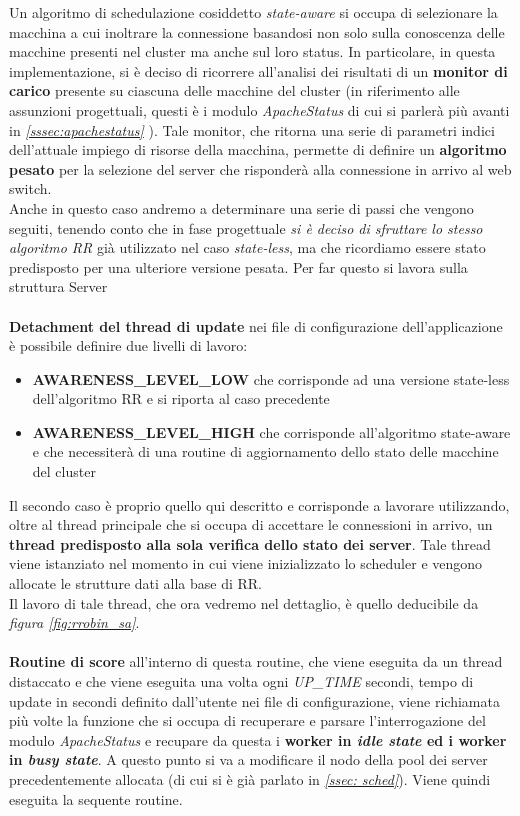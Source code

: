 \documentclass[italian]{tktltiki2}
\begin{document}
Un algoritmo di schedulazione cosiddetto \emph{state-aware} si occupa di selezionare la macchina a cui inoltrare la connessione basandosi non solo sulla conoscenza delle macchine presenti nel cluster ma anche sul loro status. In particolare, in questa implementazione, si è deciso di ricorrere all'analisi dei risultati di un \textbf{monitor di carico} presente su ciascuna delle macchine del cluster (in riferimento alle assunzioni progettuali, questi è i modulo \emph{ApacheStatus} di cui si parlerà più avanti in \emph{\ref{sssec:apachestatus}} ). Tale monitor, che ritorna una serie di parametri indici dell'attuale impiego di risorse della macchina, permette di definire un \textbf{algoritmo pesato} per la selezione del server che risponderà alla connessione in arrivo al web switch. \\
Anche in questo caso andremo a determinare una serie di passi che vengono seguiti, tenendo conto che in fase progettuale \emph{si è deciso di sfruttare lo stesso algoritmo RR} già utilizzato nel caso \emph{state-less}, ma che ricordiamo essere stato predisposto per una ulteriore versione pesata. Per far questo si lavora sulla struttura Server \\\\
\textbf{Detachment del thread di update} nei file di configurazione dell'applicazione è possibile definire due livelli di lavoro:
	\begin{itemize}
		\item \textbf{AWARENESS\_LEVEL\_LOW} che corrisponde ad una versione state-less dell'algoritmo RR e si riporta al caso precedente
		\item \textbf{AWARENESS\_LEVEL\_HIGH} che corrisponde all'algoritmo state-aware e che necessiterà di una routine di aggiornamento dello stato delle macchine del cluster
	\end{itemize}
	Il secondo caso è proprio quello qui descritto e corrisponde a lavorare utilizzando, oltre al thread principale che si occupa di accettare le connessioni in arrivo, un \textbf{thread predisposto alla sola verifica dello stato dei server}. Tale thread viene istanziato nel momento in cui viene inizializzato lo scheduler e vengono allocate le strutture dati alla base di RR. \\
	Il lavoro di tale thread, che ora vedremo nel dettaglio, è quello deducibile da \emph{figura \ref{fig:rrobin_sa}}.\\\\
\textbf{Routine di score} all'interno di questa routine, che viene eseguita da un thread distaccato e che viene eseguita una volta ogni \emph{UP\_TIME} secondi, tempo di update in secondi definito dall'utente nei file di configurazione, viene richiamata più volte la funzione che si occupa di recuperare e parsare l'interrogazione del modulo \emph{ApacheStatus} e recupare da questa i \textbf{worker in \emph{idle state} ed i worker in \emph{busy state}}. A questo punto si va a modificare il nodo della pool dei server precedentemente allocata (di cui si è già parlato in \emph{\ref{ssec: sched}}). Viene quindi eseguita la sequente routine. \\
\end{document}
